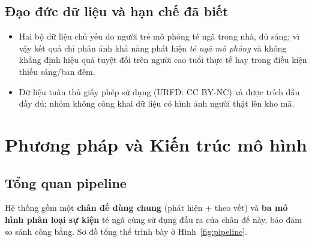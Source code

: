 \documentclass[fontsize=13pt,a4paper,oneside,DIV=calc,chapterprefix=true]{scrbook}
\begin{document}
\section{Đạo đức dữ liệu và hạn chế đã biết}
\begin{itemize}[leftmargin=1.2cm]
    \item Hai bộ dữ liệu chủ yếu do người trẻ mô phỏng té ngã trong nhà, đủ sáng; vì vậy kết quả chỉ phản ánh khả năng phát hiện \emph{té ngã mô phỏng} và không khẳng định hiệu quả tuyệt đối trên người cao tuổi thực tế hay trong điều kiện thiếu sáng/ban đêm.
    \item Dữ liệu tuân thủ giấy phép sử dụng (URFD: CC BY-NC) và được trích dẫn đầy đủ; nhóm không công khai dữ liệu có hình ảnh người thật lên kho mã.
\end{itemize}

\chapter{Phương pháp và Kiến trúc mô hình}
\label{chap:method}

\section{Tổng quan pipeline}
Hệ thống gồm một \textbf{chân đế dùng chung} (phát hiện + theo vết) và \textbf{ba mô hình phân loại sự kiện} té ngã cùng sử dụng đầu ra của chân đế này, bảo đảm so sánh công bằng. Sơ đồ tổng thể trình bày ở Hình~\ref{fig:pipeline}.
\end{document}

